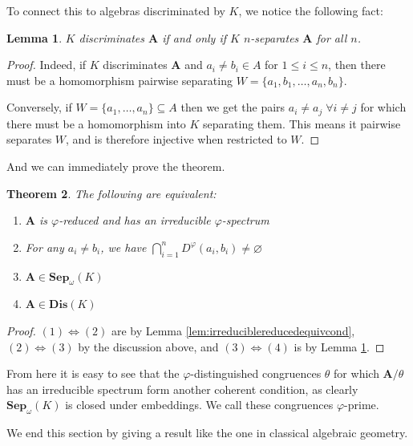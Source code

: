 \documentclass{article}
\theoremstyle{plain}
\newtheorem{theorem}{Theorem}[section]
\newtheorem{lemma}[theorem]{Lemma}
\theoremstyle{definition}
\begin{document}
To connect this to algebras discriminated by $K$, we notice the following fact:

\begin{lemma} \label{prop:disisgensep}
    $K$ discriminates $\mathbf{A}$ if and only if $K$ $n$-separates $\mathbf{A}$ for all $n$.
\end{lemma}
\begin{proof}
    Indeed, if $K$ discriminates $\mathbf{A}$ and $a_i\neq b_i \in A$ for $1\leq i\leq n$, then there must be a homomorphism pairwise separating $W = \{ a_1, b_1, \dots, a_n, b_n\}$.\par
    Conversely, if $W = \{ a_1, \dots, a_n\} \subseteq A$ then we get the pairs
    $a_i \neq a_j \; \forall i\neq j$
    for which there must be a homomorphism into $K$ separating them.
    This means it pairwise separates $W$, and is therefore injective when restricted to $W$.
\end{proof}

And we can immediately prove the theorem.

\begin{theorem} \label{theo:irrsetisprime}
    The following are equivalent:
    \begin{enumerate}
        \item $\mathbf{A}$ is $\varphi$-reduced and has an irreducible $\varphi$-spectrum
        \item For any $a_i\neq b_i$, we have $\bigcap_{i=1}^n D^\varphi(a_i, b_i) \neq \varnothing$
        \item $\mathbf{A} \in \mathbf{Sep}_\omega(K)$
        \item $\mathbf{A} \in \mathbf{Dis}(K)$
    \end{enumerate}
\end{theorem}
\begin{proof}
    $(1) \iff (2)$ are by Lemma \ref{lem:irreduciblereducedequivcond}, $(2) \iff (3)$ by the discussion above, and $(3) \iff (4)$ is by Lemma \ref{prop:disisgensep}.
\end{proof}

From here it is easy to see that the $\varphi$-distinguished congruences $\theta$ for which $\mathbf{A}/\theta$ has an irreducible spectrum form another coherent condition, as clearly $\mathbf{Sep}_\omega(K)$ is closed under embeddings.
We call these congruences $\varphi$-prime.

We end this section by giving a result like the one in classical algebraic geometry.
\end{document}
